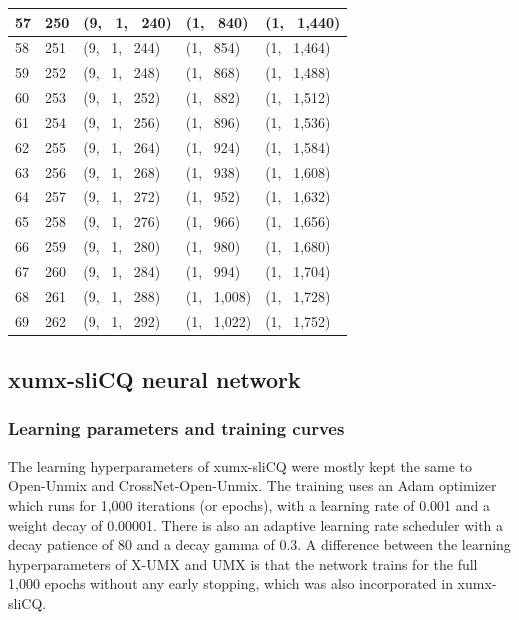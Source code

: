 \documentclass[report.tex]{subfiles}
\begin{document}
\begin{table}[ht]
\begin{tabular}{ |l|l|l|l|l| }
\hline
57 & 250 & (9, \ 1, \ 240) & (1, \ 840) & (1, \ 1,440) \\
\hline
58 & 251 & (9, \ 1, \ 244) & (1, \ 854) & (1, \ 1,464) \\
\hline
59 & 252 & (9, \ 1, \ 248) & (1, \ 868) & (1, \ 1,488) \\
\hline
60 & 253 & (9, \ 1, \ 252) & (1, \ 882) & (1, \ 1,512) \\
\hline
61 & 254 & (9, \ 1, \ 256) & (1, \ 896) & (1, \ 1,536) \\
\hline
62 & 255 & (9, \ 1, \ 264) & (1, \ 924) & (1, \ 1,584) \\
\hline
63 & 256 & (9, \ 1, \ 268) & (1, \ 938) & (1, \ 1,608) \\
\hline
64 & 257 & (9, \ 1, \ 272) & (1, \ 952) & (1, \ 1,632) \\
\hline
65 & 258 & (9, \ 1, \ 276) & (1, \ 966) & (1, \ 1,656) \\
\hline
66 & 259 & (9, \ 1, \ 280) & (1, \ 980) & (1, \ 1,680) \\
\hline
67 & 260 & (9, \ 1, \ 284) & (1, \ 994) & (1, \ 1,704) \\
\hline
68 & 261 & (9, \ 1, \ 288) & (1, \ 1,008) & (1, \ 1,728) \\
\hline
69 & 262 & (9, \ 1, \ 292) & (1, \ 1,022) & (1, \ 1,752) \\
\hline
\end{tabular}
\end{table}

\newpagefill

\subsection{xumx-sliCQ neural network}

\subsubsection{Learning parameters and training curves}

The learning hyperparameters of xumx-sliCQ were mostly kept the same to Open-Unmix and CrossNet-Open-Unmix. The training uses an Adam optimizer which runs for 1,000 iterations (or epochs), with a learning rate of 0.001 and a weight decay of 0.00001. There is also an adaptive learning rate scheduler with a decay patience of 80 and a decay gamma of 0.3. A difference between the learning hyperparameters of X-UMX and UMX is that the network trains for the full 1,000 epochs without any early stopping, which was also incorporated in xumx-sliCQ.
\end{document}
